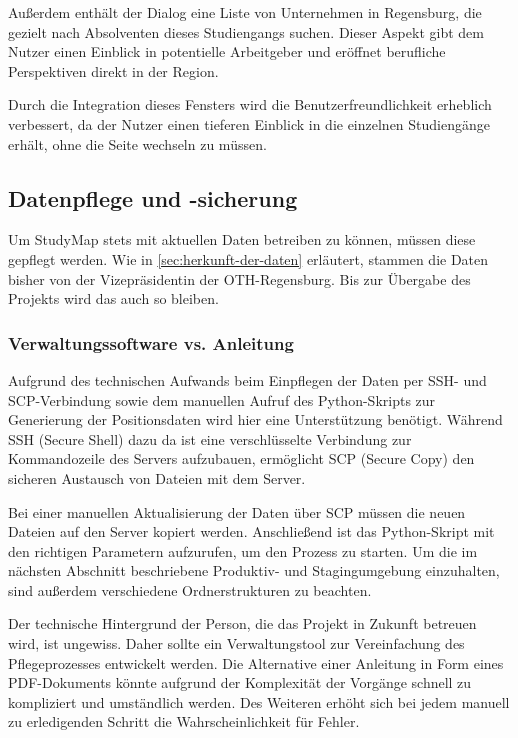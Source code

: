Außerdem enthält der Dialog eine Liste von Unternehmen in Regensburg, die
gezielt nach Absolventen dieses Studiengangs suchen. Dieser Aspekt gibt dem
Nutzer einen Einblick in potentielle Arbeitgeber und eröffnet berufliche
Perspektiven direkt in der Region.

Durch die Integration dieses Fensters wird die Benutzerfreundlichkeit erheblich 
verbessert, da der Nutzer einen tieferen Einblick in die einzelnen Studiengänge
erhält, ohne die Seite wechseln zu müssen.

\subsection{Datenpflege und -sicherung}
Um StudyMap stets mit aktuellen Daten betreiben zu können, müssen diese gepflegt werden. Wie in \autoref{sec:herkunft-der-daten} erläutert, stammen die Daten bisher von der Vizepräsidentin der OTH-Regensburg. Bis zur Übergabe des Projekts wird das auch so bleiben.

\subsubsection{Verwaltungssoftware vs. Anleitung}\label{sec:verwaltungssoftware}
Aufgrund des technischen Aufwands beim Einpflegen der Daten per SSH- und SCP-Verbindung sowie dem manuellen Aufruf des Python-Skripts zur Generierung der Positionsdaten wird hier eine Unterstützung benötigt. Während SSH (Secure Shell) dazu da ist eine verschlüsselte Verbindung zur Kommandozeile des Servers aufzubauen, ermöglicht SCP (Secure Copy) den sicheren Austausch von Dateien mit dem Server.

Bei einer manuellen Aktualisierung der Daten über SCP müssen die neuen Dateien auf den Server kopiert werden. Anschließend ist das Python-Skript mit den richtigen Parametern aufzurufen, um den Prozess zu starten. Um die im nächsten Abschnitt beschriebene Produktiv- und Stagingumgebung einzuhalten, sind außerdem verschiedene Ordnerstrukturen zu beachten.

Der technische Hintergrund der Person, die das Projekt in Zukunft betreuen wird, ist ungewiss. Daher sollte ein Verwaltungstool zur Vereinfachung des Pflegeprozesses entwickelt werden. Die Alternative einer Anleitung in Form eines PDF-Dokuments könnte aufgrund der Komplexität der Vorgänge schnell zu kompliziert und umständlich werden. Des Weiteren erhöht sich bei jedem manuell zu erledigenden Schritt die Wahrscheinlichkeit für Fehler.

